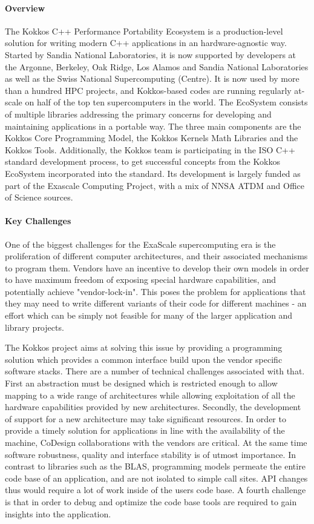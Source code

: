 \paragraph{Overview} 

The Kokkos C++ Performance Portability Ecosystem is a production-level solution for writing modern C++ applications in an hardware-agnostic way.
Started by Sandia National Laboratories, it is now supported by developers at the Argonne, Berkeley, Oak Ridge, Los Alamos and Sandia National Laboratories as well as the Swiss National Supercomputing (Centre).
It is now used by more than a hundred HPC projects, and Kokkos-based codes are running regularly at-scale on half of the top ten supercomputers in the world. 
The EcoSystem consists of multiple libraries addressing the primary concerns for developing and maintaining applications in a portable way.
The three main components are the Kokkos Core Programming Model, the Kokkos Kernels Math Libraries and the Kokkos Tools.
Additionally, the Kokkos team is participating in the ISO C++ standard development process, to get successful concepts from the Kokkos EcoSystem incorporated into the standard. 
Its development is largely funded as part of the Exascale Computing Project, with a mix of NNSA ATDM and Office of Science sources. 

 
\paragraph{Key Challenges}

One of the biggest challenges for the ExaScale supercomputing era is the proliferation of different computer architectures, and their associated mechanisms to program them.
Vendors have an incentive to develop their own models in order to have maximum freedom of exposing special hardware capabilities, and potentially achieve "vendor-lock-in".
This poses the problem for applications that they may need to write different variants of their code for different machines - an effort which can be simply not feasible for many of the larger application and library projects.

The Kokkos project aims at solving this issue by providing a programming solution which provides a common interface build upon the vendor specific software stacks.
There are a number of technical challenges associated with that. 
First an abstraction must be designed which is restricted enough to allow mapping to a wide range of architectures while allowing exploitation of all the hardware capabilities provided by new architectures. 
Secondly, the development of support for a new architecture may take significant resources. In order to provide a timely solution for applications in line with the availability of the machine, CoDesign collaborations with the vendors are critical.
At the same time software robustness, quality and interface stability is of utmost importance. 
In contrast to libraries such as the BLAS, programming models permeate the entire code base of an application, and are not isolated to simple call sites. 
API changes thus would require a lot of work inside of the users code base. 
A fourth challenge is that in order to debug and optimize the code base tools are required to gain insights into the application. 

